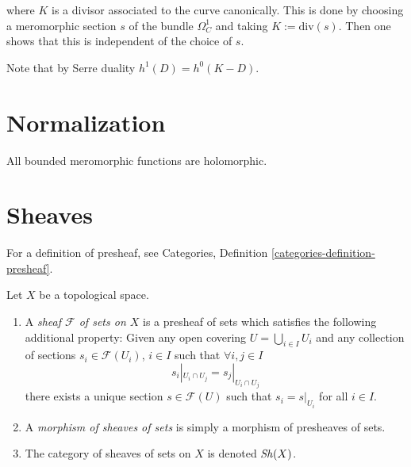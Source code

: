 \noindent
where $K$ is a divisor associated to the curve canonically.
This is done by choosing a meromorphic section $s$
of the bundle $\Omega_C^1$
and taking $K:=\text{div}(s)$.
Then one shows that this is independent of the choice of $s$.

Note that by Serre duality
$h^1(D)=h^0(K-D)$.


\section{Normalization}
\label{section-normalization}

All bounded meromorphic functions are holomorphic.



\section{Sheaves}
\label{section-sheaves}

For a definition of presheaf,
see Categories, Definition \ref{categories-definition-presheaf}.

\begin{definition}
\label{definition-sheaf}
Let $X$ be a topological space.
\begin{enumerate}
\item A {\it sheaf $\mathcal{F}$ of sets on $X$} is a presheaf
of sets which satisfies the following additional property: Given
any open covering $U = \bigcup_{i \in I} U_i$ and any collection
of sections $s_i \in \mathcal{F}(U_i)$, $i \in I$ such that
$\forall i, j\in I$
$$
s_i|_{U_i \cap U_j} = s_j|_{U_i \cap U_j}
$$
there exists a unique section $s \in \mathcal{F}(U)$ such that
$s_i = s|_{U_i}$ for all $i \in I$.
\item A {\it morphism of sheaves of sets} is simply a
morphism of presheaves of sets.
\item The category of sheaves of sets on $X$ is denoted
$\mathop{\mathit{Sh}}\nolimits(X)$.
\end{enumerate}
\end{definition}


